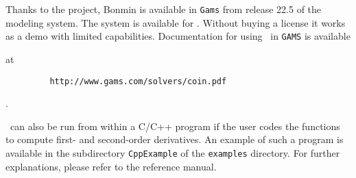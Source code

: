 Thanks to the  project, 
Bonmin is available in {\tt Gams} from release 22.5 of the  modeling system. 
The system is available for . Without buying a license it works as a demo with limited capabilities. Documentation for using \Bonmin\ in {\tt GAMS} is available
\begin{latexonly} at
\begin{verbatim}
         http://www.gams.com/solvers/coin.pdf
\end{verbatim}
\end{latexonly}
\begin{htmlonly} . \end{htmlonly}


\Bonmin\ can also be run from within a C/C++ program if the user codes
the functions to compute first- and second-order derivatives.
An example of such a program is available in the subdirectory {\tt CppExample} of
the {\tt examples} directory. For further explanations, please refer to the reference manual.
